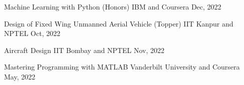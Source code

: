 

\begin{cvhonors}

  \cvhonor
  {Machine Learning with Python (Honors)} %
  {IBM and Coursera} %
  {} %
  {Dec, 2022} %


  \cvhonor
  {Design of Fixed Wing Unmanned Aerial Vehicle (Topper)} %
  {IIT Kanpur and NPTEL} %
  {} %
  {Oct, 2022} %


  \cvhonor
  {Aircraft Design} %
  {IIT Bombay and NPTEL} %
  {} %
  {Nov, 2022} %


  \cvhonor
  {Mastering Programming with MATLAB} %
  {Vanderbilt University and Coursera} %
  {} %
  {May, 2022} %

\end{cvhonors}
